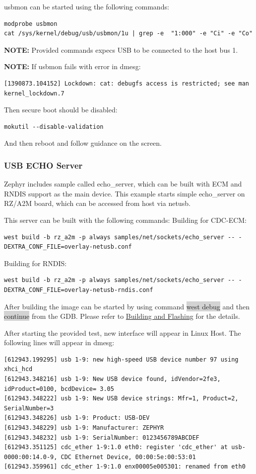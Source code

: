 \documentclass[11pt,a4paper,oneside]{article}
\begin{document}
usbmon can be started using the following commands:
\begin{lstlisting}
modprobe usbmon
cat /sys/kernel/debug/usb/usbmon/1u | grep -e  "1:000" -e "Ci" -e "Co"
\end{lstlisting}

\textbf{NOTE:} Provided commands expecs USB to be connected to the host bus 1.

\textbf{NOTE:} If usbmon fails with error in dmesg:
\begin{lstlisting}
[1390873.104152] Lockdown: cat: debugfs access is restricted; see man kernel_lockdown.7
\end{lstlisting}
Then secure boot should be disabled:
\begin{lstlisting}
mokutil --disable-validation
\end{lstlisting}
And then reboot and follow guidance on the screen.

\subsubsection{USB ECHO Server}\label{usb-echo-server}

Zephyr includes sample called echo\_server, which can be built with ECM and
RNDIS support as the main device. This example starts simple echo\_server on RZ/A2M board, which can be accessed from host via netusb.

This server can be built with the following commands:
Building for CDC-ECM:
\begin{lstlisting}
west build -b rz_a2m -p always samples/net/sockets/echo_server -- -DEXTRA_CONF_FILE=overlay-netusb.conf
\end{lstlisting}
Building for RNDIS:
\begin{lstlisting}
west build -b rz_a2m -p always samples/net/sockets/echo_server -- -DEXTRA_CONF_FILE=overlay-netusb-rndis.conf
\end{lstlisting}

After building the image can be started by using command \colorbox{lightgray}{west debug}
and then \colorbox{lightgray}{continue} from the GDB. Please refer to
\hyperref[building-and-flashing]{Building and Flashing} for the
details.

After starting the provided test, new interface will appear in Linux Host.
The following lines will appear in dmesg:
\begin{lstlisting}
[612943.199295] usb 1-9: new high-speed USB device number 97 using xhci_hcd
[612943.348216] usb 1-9: New USB device found, idVendor=2fe3, idProduct=0100, bcdDevice= 3.05
[612943.348222] usb 1-9: New USB device strings: Mfr=1, Product=2, SerialNumber=3
[612943.348226] usb 1-9: Product: USB-DEV
[612943.348229] usb 1-9: Manufacturer: ZEPHYR
[612943.348232] usb 1-9: SerialNumber: 0123456789ABCDEF
[612943.351125] cdc_ether 1-9:1.0 eth0: register 'cdc_ether' at usb-0000:00:14.0-9, CDC Ethernet Device, 00:00:5e:00:53:01
[612943.359961] cdc_ether 1-9:1.0 enx00005e005301: renamed from eth0
\end{lstlisting}
\end{document}
